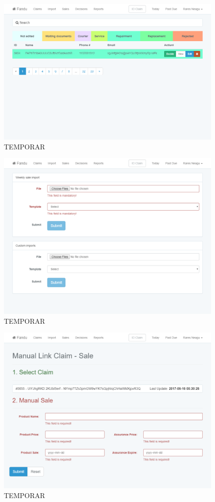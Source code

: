 	\begin{figure}
		\includegraphics[width=\linewidth]{../imagini/claims_filtered.png}
		\caption{TEMPORAR}
		\label{fig:TEMP}
	\end{figure}
	\begin{figure}
		\includegraphics[width=\linewidth]{../imagini/claims_import_filters.png}
		\caption{TEMPORAR}
		\label{fig:TEMP}
	\end{figure}
	\begin{figure}
		\includegraphics[width=\linewidth]{../imagini/claims_manual_sale.png}
		\caption{TEMPORAR}
		\label{fig:TEMP}
	\end{figure}
